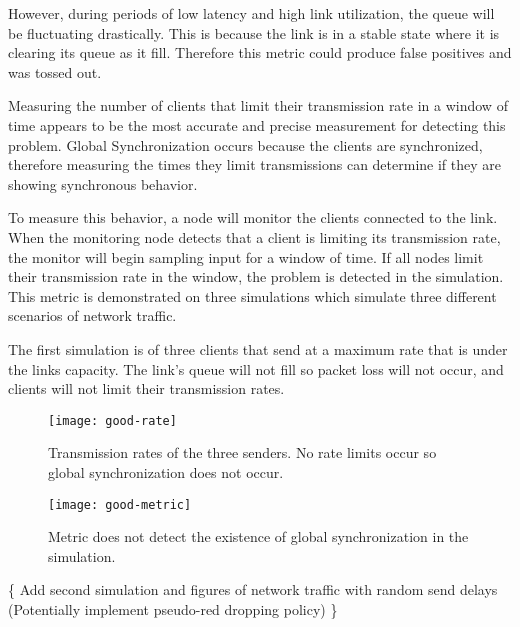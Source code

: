 \documentclass{article}
\begin{document}
	However, during periods of low latency and high link utilization, the queue will be fluctuating drastically. This is because the link is in a stable state where it is clearing its queue as it fill. Therefore this metric could produce false positives and was tossed out.\newline
	
	Measuring the number of clients that limit their transmission rate in a window of time appears to be the most accurate and precise measurement for detecting this problem. Global Synchronization occurs because the clients are synchronized, therefore measuring the times they limit transmissions can determine if they are showing synchronous behavior.\newline
																	
	To measure this behavior, a node will monitor the clients connected to the link. When the monitoring node detects that a client is limiting its transmission rate, the monitor will begin sampling input for a window of time. If all nodes limit their transmission rate in the window, the problem is detected in the simulation.\newline
	This metric is demonstrated on three simulations which simulate three different scenarios of network traffic.\newline
	
	The first simulation is of three clients that send at a maximum rate that is under the links capacity. The link's queue will not fill so packet loss will not occur, and clients will not limit their transmission rates.\newline
	\begin{figure}[H]
		\centering
		\texttt{[image: good-rate]}
		\caption{Transmission rates of the three senders. No rate limits occur so global synchronization does not occur.}
	\end{figure}

	\begin{figure}[H]
		\centering
		\texttt{[image: good-metric]}
		\caption{Metric does not detect the existence of global synchronization in the simulation.}
	\end{figure}
	
																			\{ Add second simulation and figures of network traffic with random send delays (Potentially implement pseudo-red dropping policy) \}\newline
																			
\end{document}
